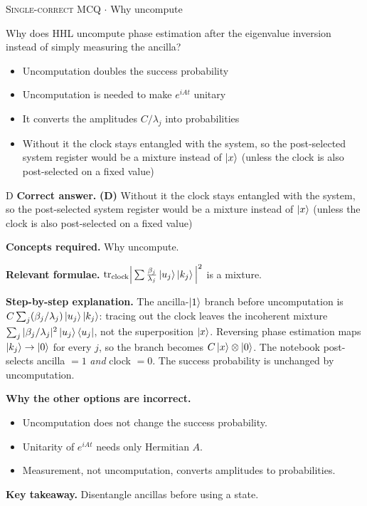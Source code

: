 \documentclass[11pt,a4paper]{article}
\newcommand{\optlabel}[1]{\textbf{(#1)}}
\newcommand{\correctlabel}[1]{\textcolor{okgreen}{\textbf{(#1)}\,\ding{51}}}
\newenvironment{qitem}[1]{\begin{list}{}{\setlength{\leftmargin}{3.3em}\setlength{\labelwidth}{3.1em}%
  \setlength{\labelsep}{0.2em}\setlength{\topsep}{3pt}\setlength{\parsep}{3pt}}\item[\textbf{Q.#1}\hfill]}{\end{list}}
\newcommand{\qsep}{\par\vspace{2pt}{\color{black!15}\hrule}\vspace{4pt}}
\newcommand{\qmeta}[2]{{\footnotesize\color{black!60}\textsc{#1} \;$\cdot$\; #2}\par}
\begin{document}
\begin{qitem}{48}
\qmeta{Single-correct MCQ}{Why uncompute}
Why does HHL uncompute phase estimation after the eigenvalue inversion instead of simply measuring the ancilla?
\begin{itemize}[leftmargin=2.6em, labelsep=0.4em, itemsep=2pt, topsep=3pt]
\item[\optlabel{A}] Uncomputation doubles the success probability
\item[\optlabel{B}] Uncomputation is needed to make $e^{iAt}$ unitary
\item[\optlabel{C}] It converts the amplitudes $C/\lambda_j$ into probabilities
\item[\correctlabel{D}] Without it the clock stays entangled with the system, so the post-selected system register would be a mixture instead of $\ket x$ (unless the clock is also post-selected on a fixed value)
\end{itemize}
\end{qitem}
\begin{solbox}{D}
\textbf{\color{brand}Correct answer.} \textcolor{okgreen}{\textbf{(D)}} Without it the clock stays entangled with the system, so the post-selected system register would be a mixture instead of $\ket x$ (unless the clock is also post-selected on a fixed value)

\textbf{\color{brand}Concepts required.} Why uncompute.

\textbf{\color{brand}Relevant formulae.} $\mathrm{tr}_{\text{clock}}\Big|\sum\frac{\beta_j}{\lambda_j}\ket{u_j}\ket{k_j}\Big|^2$ is a mixture.

\textbf{\color{brand}Step-by-step explanation.} The ancilla-$\ket1$ branch before uncomputation is $C\sum_j(\beta_j/\lambda_j)\ket{u_j}\ket{k_j}$: tracing out the clock leaves the incoherent mixture $\sum_j|\beta_j/\lambda_j|^2\ket{u_j}\bra{u_j}$, not the
superposition $\ket x$. Reversing phase estimation maps $\ket{k_j} \to \ket0$ for every $j$, so the branch becomes $C\ket x\otimes\ket0$. The notebook post-selects ancilla $= 1$ \emph{and}
clock $= 0$. The success probability is unchanged by uncomputation.

\textbf{\color{brand}Why the other options are incorrect.}
\begin{itemize}[leftmargin=2.4em, itemsep=1pt, topsep=2pt]
\item[\textbf{(A)}] Uncomputation does not change the success probability.
\item[\textbf{(B)}] Unitarity of $e^{iAt}$ needs only Hermitian $A$.
\item[\textbf{(C)}] Measurement, not uncomputation, converts amplitudes to probabilities.
\end{itemize}
\textbf{\color{brand}Key takeaway.} Disentangle ancillas before using a state.
\end{solbox}
\qsep
\end{document}

